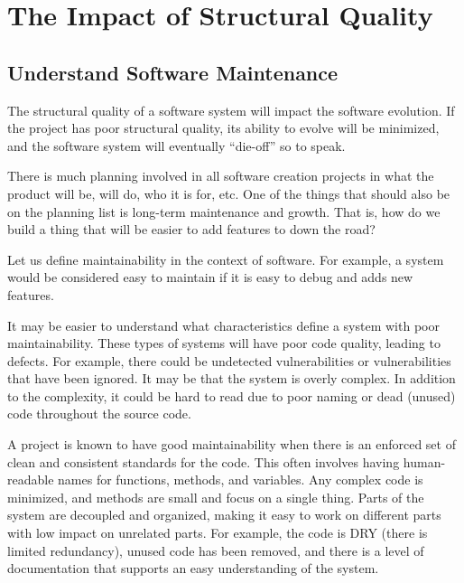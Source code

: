 \documentclass[12pt,conference]{IEEEtran}
\begin{document}

\vspace{0.5cm}
\section{The Impact of Structural Quality}
\vspace{0.25cm}

\subsection{Understand Software Maintenance}

The structural quality of a software system will impact the software evolution. If the project has poor structural quality, its ability to evolve will be minimized, and the software system will eventually ``die-off'' so to speak.

There is much planning involved in all software creation projects in what the product will be, will do, who it is for, etc. One of the things that should also be on the planning list is long-term maintenance and growth. That is, how do we build a thing that will be easier to add features to down the road?

Let us define maintainability in the context of software. For example, a system would be considered easy to maintain if it is easy to debug and adds new features.

It may be easier to understand what characteristics define a system with poor maintainability. These types of systems will have poor code quality, leading to defects. For example, there could be undetected vulnerabilities or vulnerabilities that have been ignored. It may be that the system is overly complex. In addition to the complexity, it could be hard to read due to poor naming or dead (unused) code throughout the source code.

A project is known to have good maintainability when there is an enforced set of clean and consistent standards for the code. This often involves having human-readable names for functions, methods, and variables. Any complex code is minimized, and methods are small and focus on a single thing. Parts of the system are decoupled and organized, making it easy to work on different parts with low impact on unrelated parts. For example, the code is DRY (there is limited redundancy), unused code has been removed, and there is a level of documentation that supports an easy understanding of the system.
\end{document}
